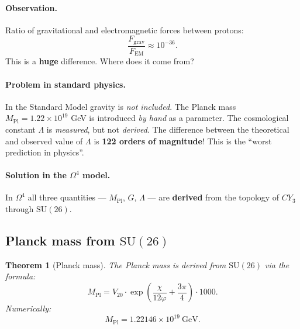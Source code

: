 \documentclass[11pt,a4paper]{article}
\newcommand{\SU}{\mathrm{SU}}
\newcommand{\CY}{CY_3}
\newcommand{\Om}{\Omega^4}
\newcommand{\Mpl}{M_{\text{Pl}}}
\newtheorem{theorem}{Theorem}[section]
\theoremstyle{definition}
\begin{document}
\paragraph{Observation.}
Ratio of gravitational and electromagnetic forces between 
protons:
\begin{equation}
    \frac{F_{\text{grav}}}{F_{\text{EM}}} 
    \approx 10^{-36}.
\end{equation}
This is a \textbf{huge} difference. Where does it come from?

\paragraph{Problem in standard physics.}
In the Standard Model gravity is \emph{not included}. The Planck 
mass $\Mpl = 1.22 \times 10^{19}$ GeV is introduced \emph{by hand} 
as a parameter. The cosmological constant $\Lambda$ is 
\emph{measured}, but not \emph{derived}. The difference between 
the theoretical and observed value of $\Lambda$ is 
\textbf{122 orders of magnitude}! This is the ``worst prediction in physics''.

\paragraph{Solution in the $\Om$ model.}
In $\Om$ all three quantities — $\Mpl$, $G$, $\Lambda$ — are 
\textbf{derived} from the topology of $\CY$ through $\SU(26)$.

\subsection{Planck mass from $\SU(26)$}
\label{subsec:planck-mass}

\begin{theorem}[Planck mass]
\label{thm:planck-mass}
The Planck mass is derived from $\SU(26)$ via the formula:
\begin{equation}
    \boxed{
    \Mpl = V_{20} \cdot \exp\left(\frac{\chi}{12\varphi} 
    + \frac{3\pi}{4}\right) \cdot 1000.
    }
    \label{eq:planck-mass}
\end{equation}
Numerically:
\begin{equation}
    \Mpl = 1.22146 \times 10^{19}~\text{GeV}.
\end{equation}
\end{theorem}
\end{document}
